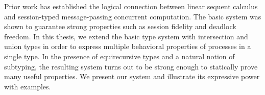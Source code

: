 Prior work has established the logical connection between linear sequent calculus and session-typed message-passing concurrent computation. The basic system was shown to guarantee strong properties such as session fidelity and deadlock freedom. In this thesis, we extend the basic type system with intersection and union types in order to express multiple behavioral properties of processes in a single type. In the presence of equirecursive types and a natural notion of subtyping, the resulting system turns out to be strong enough to statically prove many useful properties. %
We present our system and illustrate its expressive power with examples.
